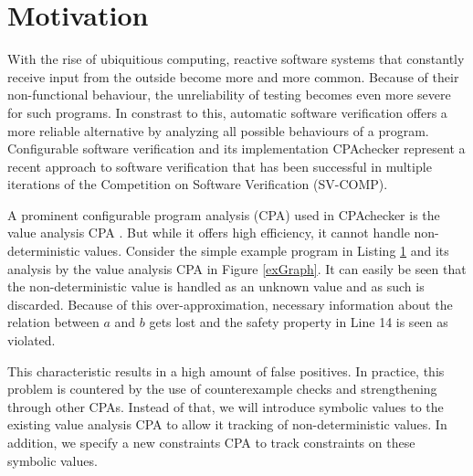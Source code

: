 \section{Motivation}
With the rise of ubiquitious computing, reactive software systems that constantly receive input from the outside become more and more common.
Because of their non\--func\-tio\-nal behaviour, the unreliability of testing becomes even more severe for such programs.
In constrast to this, automatic software verification offers a more reliable alternative by analyzing all possible behaviours of a program.
Configurable software verification\cite{Beyer2007} and its implementation CPAchecker\cite{Beyer2011} represent a recent approach to software verification that has been successful in
multiple iterations of the Competition on Software Verification (SV-COMP).

A prominent configurable program analysis (CPA) used in CPAchecker is the value analysis CPA \cite{Beyer2012}.
But while it offers high efficiency, it cannot handle non-deterministic values.
Consider the simple example program in Listing \ref{exProg} and its analysis by the value analysis CPA in Figure \ref{exGraph}.
It can easily be seen that the non-deterministic value is handled as an unknown value and as such is discarded.
Because of this over-approximation, necessary information about the relation between $a$ and $b$ gets lost and the safety property in Line 14 is seen as violated.


\begin{figure}[h]
\label{exProg}
\lstset{numbers=left}

\end{figure}

This characteristic results in a high amount of false positives.
In practice, this problem is countered by the use of counterexample checks and strengthening through other CPAs.
Instead of that, we will introduce symbolic values to the existing value analysis CPA to allow it tracking of non-deterministic values.
In addition, we specify a new constraints CPA to track constraints on these symbolic values.

